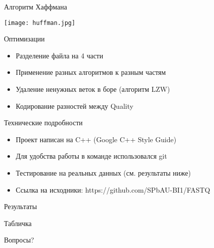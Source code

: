 \documentclass[12pt]{beamer}
\begin{document}
\begin{frame}{Алгоритм Хаффмана}

	\texttt{[image: huffman.jpg]}

\end{frame}

\begin{frame}{Оптимизации}

    \begin{itemize}

        \item <1-> Разделение файла на 4 части

        \item <2-> Применение разных алгоритмов к разным частям 

        \item <3-> Удаление ненужных веток в боре (алгоритм LZW)

        \item <4-> Кодирование разностей между Quality
    
    \end{itemize} 

\end{frame}



\begin{frame}{Технические подробности}

    \begin{itemize}
    
        \item <1-> Проект написан на C++ (Google C++ Style Guide)

        \item <2-> Для удобства работы в команде использовался git

        \item <3-> Тестирование на реальных данных (см. результаты ниже)

        \item <4-> Ссылка на исходники: https://github.com/SPbAU-BI1/FASTQ

    \end{itemize}

\end{frame}

\begin{frame}{Результаты}
    
	Табличка
    
\end{frame}

\begin{frame}{}

    Вопросы?

\end{frame}
\end{document}
